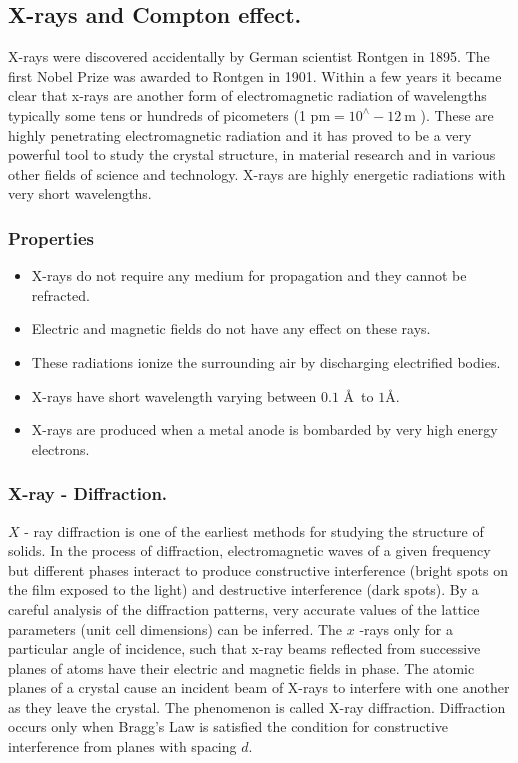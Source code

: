 \subsection{X-rays and Compton effect.}
X-rays were discovered accidentally by German scientist Rontgen in 1895. The first Nobel Prize was awarded to Rontgen in 1901. Within a few years it became clear that x-rays are another form of electromagnetic radiation of wavelengths typically some tens or hundreds of picometers (1 $\mathrm{pm}=10^{\wedge}-12 \mathrm{~m}$ ). These are  highly penetrating electromagnetic radiation and it has proved to be a very powerful tool to study the crystal structure, in material research and in various other fields of science and technology.  X-rays are highly energetic radiations with very short wavelengths.
\subsubsection{Properties}
\begin{itemize}
	
	\item  X-rays do not require any medium for propagation and they cannot be refracted.
	\item  Electric and magnetic fields do not have any effect on these rays.
	\item  These radiations ionize the surrounding air by discharging electrified bodies.
	\item   X-rays have short wavelength varying between $0.1 $ \AA \ to $1 $\AA.
	\item   X-rays are produced when a metal anode is bombarded by very high energy electrons.
\end{itemize}
\subsubsection{X-ray - Diffraction.}
$X$ - ray diffraction is one of the earliest methods for studying the structure of solids. In the process of diffraction, electromagnetic waves of a given frequency but different phases interact to produce constructive interference (bright spots on the film exposed to the light) and destructive interference (dark spots). By a careful analysis of the diffraction patterns, very accurate values of the lattice parameters (unit cell dimensions) can be inferred.
The $x$ -rays only for a particular angle of incidence, such that x-ray beams reflected from successive planes of atoms have their electric and magnetic fields in phase.
The atomic planes of a crystal cause an incident beam of X-rays to interfere with one another as they leave the crystal. The phenomenon is called X-ray diffraction. Diffraction occurs only when Bragg's Law is satisfied the condition for constructive interference  from planes with spacing ${d}$.
